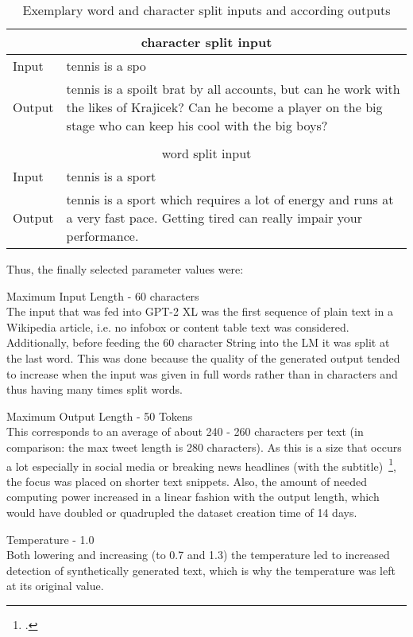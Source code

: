 \begin{table}
		\begin{tabular}{ | l | p{14cm} | }
		\multicolumn{2}{c}{character split input} \\
		\hline
		Input & tennis is a spo \\ \hline
  		Output & tennis is a spoilt brat by all accounts, but can he work with the likes of Krajicek? Can he become a player on the big stage who can keep his cool with the big boys? \\
		\hline
  		\multicolumn{2}{c}{} \\
  		\multicolumn{2}{c}{word split input} \\
  		\hline			
  		Input & tennis is a sport \\ \hline
  		Output & tennis is a sport which requires a lot of energy and runs at a very fast pace. Getting tired can really impair your performance. \\
  		\hline
	\end{tabular}
	\caption{Exemplary word and character split inputs and according outputs} \label{tab:word_vs_char_split}
\end{table}

Thus, the finally selected parameter values were:

Maximum Input Length - 60 characters \\
The input that was fed into GPT-2 XL was the first sequence of plain text in a Wikipedia article, i.e. no infobox or content table text was considered. Additionally, before feeding the 60 character String into the LM it was split at the last word. This was done because the quality of the generated output tended to increase when the input was given in full words rather than in characters and thus having many times split words.

Maximum Output Length - 50 Tokens \\
This corresponds to an average of about 240 - 260 characters per text (in comparison: the max tweet length is 280 characters). As this is a size that occurs a lot especially in social media or breaking news headlines (with the subtitle)~\footcite{lee2014proven}, the focus was placed on shorter text snippets. Also, the amount of needed computing power increased in a linear fashion with the output length, which would have doubled or quadrupled the dataset creation time of 14 days. 

Temperature - 1.0 \\
Both lowering and increasing (to 0.7 and 1.3) the temperature led to increased detection of synthetically generated text, which is why the temperature was left at its original value.

